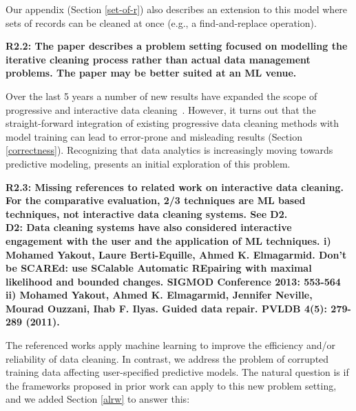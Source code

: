 Our appendix (Section \ref{set-of-r}) also describes an extension to this model where sets of records can be cleaned at once (e.g., a find-and-replace operation).

\vspace{0.5em}

\noindent\textbf{R2.2: The paper describes a problem setting focused on modelling the iterative cleaning process rather than actual data management problems. The paper may be better suited at an ML venue.}

Over the last 5 years a number of new results have expanded the scope of progressive and interactive data cleaning~\cite{mayfield2010eracer, DBLP:journals/pvldb/YakoutENOI11, yakout2013don, altowim2014progressive, whang2014incremental, papenbrock2015progressive, gruenheid2014incremental}.
However,  it turns out that the straight-forward integration of existing progressive data cleaning methods with model training can lead to error-prone and misleading results (Section \ref{correctness}).
Recognizing that data analytics is increasingly moving towards predictive modeling, \sys presents an initial exploration of this problem.  

\vspace{0.5em}

\noindent\textbf{R2.3: Missing references to related work on interactive data cleaning. For the comparative evaluation, 2/3 techniques are ML based techniques, not interactive data cleaning systems. See D2.\\
D2: Data cleaning systems have also considered interactive engagement with the user and the application of ML techniques. 
i) Mohamed Yakout, Laure Berti-Equille, Ahmed K. Elmagarmid. Don't be SCAREd: use SCalable Automatic REpairing with maximal likelihood and bounded changes. SIGMOD Conference 2013: 553-564
ii) Mohamed Yakout, Ahmed K. Elmagarmid, Jennifer Neville, Mourad Ouzzani, Ihab F. Ilyas.
Guided data repair. PVLDB 4(5): 279-289 (2011).
}

The referenced works apply machine learning to improve the efficiency and/or reliability of data cleaning.
In contrast, we address the problem of corrupted training data affecting user-specified predictive models. 
The natural question is if the frameworks proposed in prior work can apply to this new problem setting, and we added Section \ref{alrw} to answer this:

